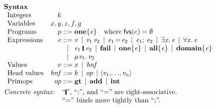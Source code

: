 \documentclass[acmsmall,review,dvipsnames]{acmart}
\newcommand{\Varid}[1]{\mathit{#1}}
\newif\iffullverse
\newcommand{\vb}{\; \ensuremath{\mathop{\mid}} \;}    %
\newcommand{\freevars}[1]{\mathsf{fvs}(#1)}
\newcommand{\hnf}{\mathit{hnf}}  %
\begin{document}
\begin{figure}
  $$
  \begin{array}{l}
    \textbf{Syntax} \\
    \begin{array}{lr@{\;}c@{\;}l}
    \text{Integers} & k \\
    \text{Variables} & \multicolumn{3}{l}{x,y,z,f,g} \\
    \text{Programs} & p  & ::=  & \ensuremath{\textbf{one}\{\Varid{e}\}} \quad \text{where} \; \freevars{e} = \emptyset \\
    \text{Expressions} & e  & ::=  & \ensuremath{\Varid{v}} \vb \ensuremath{\Varid{v}_{\mathrm{1}}\,\Varid{v}_{\mathrm{2}}}
       \vb \ensuremath{\Varid{e}_{\mathrm{1}}\hspace{-0.14em}=\hspace{-0.14em}\Varid{e}_{\mathrm{2}}} \vb \ensuremath{\Varid{e}_{\mathrm{1}};\,\Varid{e}_{\mathrm{2}}} \vb \ensuremath{\exists\Varid{x}.\,\Varid{e}} \vb \ensuremath{\forall\Varid{x}.\,\Varid{e}} \\
       && \vb & \ensuremath{\Varid{e}_{\mathrm{1}}\;\rule[-0.1em]{0.15em}{0.75em}\;\Varid{e}_{\mathrm{2}}} \vb \ensuremath{\textbf{fail}} \vb \ensuremath{\textbf{one}\{\Varid{e}\}} \vb \ensuremath{\textbf{all}\{\Varid{e}\}}
       \vb \ensuremath{\textbf{domain}\{\Varid{e}\}}
       \\
\iffullverse
    && \vb & \ensuremath{\textbf{succeeds}\;\Varid{e}} \vb \ensuremath{\textbf{decides}\;\Varid{e}} \\
\fi
       & & \vb & \ensuremath{\mu\hspace{0.03em}\Varid{v}_{\mathrm{1}}.\,\Varid{v}_{\mathrm{2}}} \\
    \text{Values} & v & ::= & x  \vb \hnf \\
    \text{Head values} & \hnf & ::= & k \vb op \vb \ensuremath{\langle\Varid{v}_{\mathrm{1}},\!\ldots\!,\Varid{v}_{\Varid{n}}\rangle} \\
    \text{Primops} & op  & ::= & \ensuremath{\textbf{gt}} \vb \ensuremath{\textbf{add}} \vb \ensuremath{\textbf{int}}
    \end{array} \\
    \\[-3mm]
    \text{\emph{Concrete syntax}:} \;\;
    \begin{array}[t]{l}
          \text{``\ensuremath{\rule[-0.1em]{0.15em}{0.75em}}'', ``;'', and ``\ensuremath{\mathrel{=}}'' are right-associative.} \\
          \text{``\ensuremath{\mathrel{=}}'' binds more tightly than ``;''.} \\

\end{array}
\end{array}$$
\end{figure}
\end{document}
